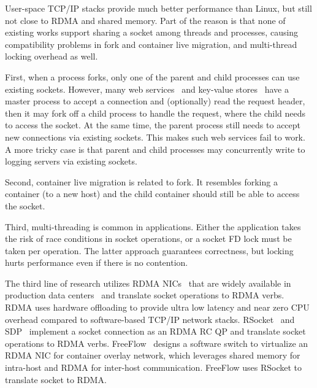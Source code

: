 User-space TCP/IP stacks provide much better performance than Linux, but still not close to RDMA and shared memory.
Part of the reason is that none of existing works support sharing a socket among threads and processes, causing compatibility problems in fork and container live migration, and multi-thread locking overhead as well.

First, when a process forks, only one of the parent and child processes can use existing sockets.
However, many web services~\cite{apache,nginx,php-fpm,python-gunicorn,vsftpd} and key-value stores~\cite{memcached} have a master process to accept a connection and (optionally) read the request header, then it may fork off a child process to handle the request, where the child needs to access the socket.
At the same time, the parent process still needs to accept new connections via existing sockets.
This makes such web services fail to work.
A more tricky case is that parent and child processes may concurrently write to logging servers via existing sockets.

Second, container live migration is related to fork.
It resembles forking a container (to a new host) and the child container should still be able to access the socket.

Third, multi-threading is common in applications.
Either the application takes the risk of race conditions in socket operations, or a socket FD lock must be taken per operation.
The latter approach guarantees correctness, but locking hurts performance even if there is no contention.


 The third line of research utilizes RDMA NICs~\cite{mellanox} that are widely available in production data centers~\cite{guo2016rdma} and translate socket operations to RDMA verbs.
RDMA uses hardware offloading to provide ultra low latency and near zero CPU overhead compared to software-based TCP/IP network stacks.
RSocket~\cite{rsockets} and SDP~\cite{socketsdirect} implement a socket connection as an RDMA RC QP and translate socket operations to RDMA verbs.
FreeFlow~\cite{nsdi19freeflow} designs a software switch to virtualize an RDMA NIC for container overlay network, which leverages shared memory for intra-host and RDMA for inter-host communication.
FreeFlow uses RSocket to translate socket to RDMA.

